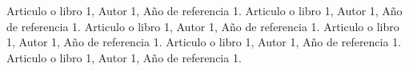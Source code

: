 \documentclass[12pt]{article}
\begin{document}
\newpage
\begin{thebibliography}{99}
 Articulo o libro 1, Autor 1, Año de referencia 1.
 Articulo o libro 1, Autor 1, Año de referencia 1.
 Articulo o libro 1, Autor 1, Año de referencia 1.
 Articulo o libro 1, Autor 1, Año de referencia 1.
 Articulo o libro 1, Autor 1, Año de referencia 1.
 Articulo o libro 1, Autor 1, Año de referencia 1.
\end{thebibliography}
\end{document}
